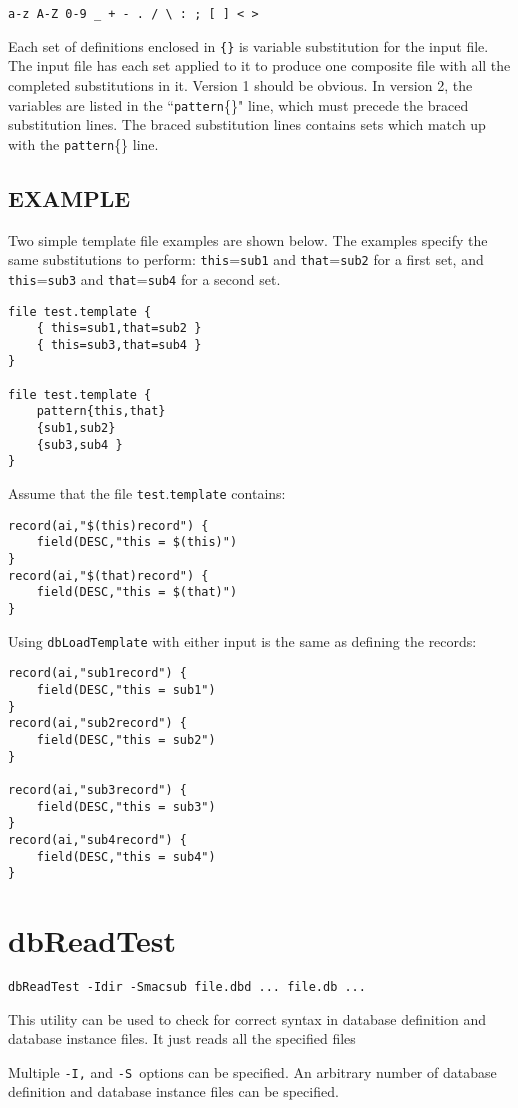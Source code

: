 \begin{verbatim}a-z A-Z 0-9 _ + - . / \ : ; [ ] < >
\end{verbatim}Each set of definitions enclosed in \verb|{}| is variable substitution for the input file. The input file has each set applied to it to 
produce one composite file with all the completed substitutions in it. Version 1 should be obvious. In version 2, the 
variables are listed in the ``\verb|pattern|\{\}" line, which must precede the braced substitution lines. The braced substitution 
lines contains sets which match up with the \verb|pattern|\{\} line.

\subsection{EXAMPLE}

Two simple template file examples are shown below. The examples specify the same substitutions to perform: 
\verb|this|=\verb|sub1| and \verb|that|=\verb|sub2| for a first set, and \verb|this|=\verb|sub3| and \verb|that|=\verb|sub4| for a second set. 

\begin{verbatim}
file test.template {
    { this=sub1,that=sub2 }
    { this=sub3,that=sub4 }
}

file test.template {
    pattern{this,that}
    {sub1,sub2}
    {sub3,sub4 }
}
\end{verbatim}Assume that the file \verb|test|.\verb|template| contains:

\begin{verbatim}
record(ai,"$(this)record") {
    field(DESC,"this = $(this)")
}
record(ai,"$(that)record") {
    field(DESC,"this = $(that)")
}
\end{verbatim}

Using \verb|dbLoadTemplate| with either input is the same as defining the records:

\begin{verbatim}record(ai,"sub1record") {
    field(DESC,"this = sub1")
}
record(ai,"sub2record") {
    field(DESC,"this = sub2")
}

record(ai,"sub3record") {
    field(DESC,"this = sub3")
}
record(ai,"sub4record") {
    field(DESC,"this = sub4")
}
\end{verbatim}\section{dbReadTest}

\begin{verbatim}dbReadTest -Idir -Smacsub file.dbd ... file.db ...
\end{verbatim}This utility can be used to check for correct syntax in database definition and database instance files. It just reads all the 
specified files

Multiple \verb|-I,| and \verb|-S |options can be specified. An arbitrary number of database definition and database instance files can 
be specified.
